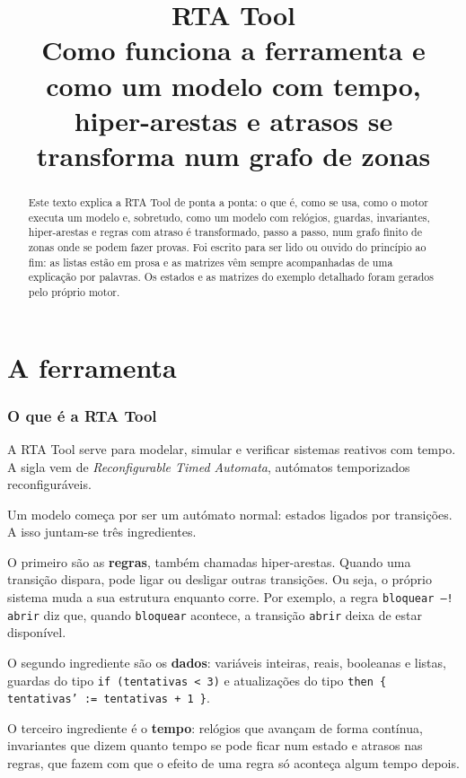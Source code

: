 \documentclass[11pt,a4paper]{article}
\title{RTA Tool\\[0.3em]\large Como funciona a ferramenta e como um modelo com tempo,\\hiper-arestas e atrasos se transforma num grafo de zonas}
\author{}
\date{}
\newcommand{\code}[1]{\texttt{#1}}
\begin{document}
\maketitle

\begin{abstract}
Este texto explica a RTA Tool de ponta a ponta: o que é, como se usa, como o motor executa um modelo e, sobretudo, como um modelo com relógios, guardas, invariantes, hiper-arestas e regras com atraso é transformado, passo a passo, num grafo finito de zonas onde se podem fazer provas. Foi escrito para ser lido ou ouvido do princípio ao fim: as listas estão em prosa e as matrizes vêm sempre acompanhadas de uma explicação por palavras. Os estados e as matrizes do exemplo detalhado foram gerados pelo próprio motor.
\end{abstract}

\tableofcontents
\newpage

\part{A ferramenta}

\section{O que é a RTA Tool}

A RTA Tool serve para modelar, simular e verificar sistemas reativos com tempo. A sigla vem de \emph{Reconfigurable Timed Automata}, autómatos temporizados reconfiguráveis.

Um modelo começa por ser um autómato normal: estados ligados por transições. A isso juntam-se três ingredientes.

O primeiro são as \textbf{regras}, também chamadas hiper-arestas. Quando uma transição dispara, pode ligar ou desligar outras transições. Ou seja, o próprio sistema muda a sua estrutura enquanto corre. Por exemplo, a regra \code{bloquear --! abrir} diz que, quando \code{bloquear} acontece, a transição \code{abrir} deixa de estar disponível.

O segundo ingrediente são os \textbf{dados}: variáveis inteiras, reais, booleanas e listas, guardas do tipo \code{if (tentativas < 3)} e atualizações do tipo \code{then \{ tentativas' := tentativas + 1 \}}.

O terceiro ingrediente é o \textbf{tempo}: relógios que avançam de forma contínua, invariantes que dizem quanto tempo se pode ficar num estado e atrasos nas regras, que fazem com que o efeito de uma regra só aconteça algum tempo depois.
\end{document}
